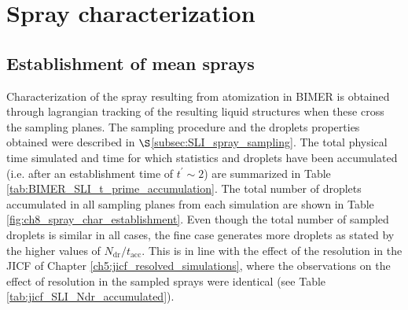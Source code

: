 \section{Spray characterization}
\label{sec:ch8_BIMER_spray_char}

\subsection{Establishment of mean sprays}

Characterization of the spray resulting from atomization in BIMER is obtained through lagrangian tracking of the resulting liquid structures when these cross the sampling planes. The sampling procedure and the droplets properties obtained were described in $\S$\ref{subsec:SLI_spray_sampling}. The total physical time simulated and time for which statistics and droplets have been accumulated (i.e. after an establishment time of $t^\prime \sim 2$) are summarized in Table \ref{tab:BIMER_SLI_t_prime_accumulation}.  The total number of droplets accumulated in all sampling planes from each simulation are shown in Table \ref{fig:ch8_spray_char_establishment}. Even though the total number of sampled droplets is similar in all cases, the fine case generates more droplets as stated by the higher values of $N_\mathrm{dr}/t_\mathrm{acc}$. This is in line with the effect of the resolution in the JICF of Chapter \ref{ch5:jicf_resolved_simulations}, where the observations on the effect of resolution in the sampled sprays were identical (see Table \ref{tab:jicf_SLI_Ndr_accumulated}). 


